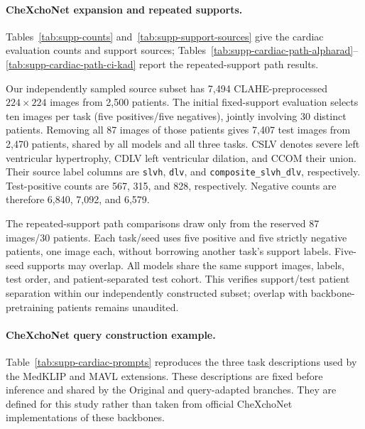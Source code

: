 \paragraph{CheXchoNet expansion and repeated supports.}
Tables~\ref{tab:supp-counts} and~\ref{tab:supp-support-sources} give the cardiac evaluation counts and support sources; Tables~\ref{tab:supp-cardiac-path-alpharad}--\ref{tab:supp-cardiac-path-ci-kad} report the repeated-support path results.

Our independently sampled source subset has 7,494 CLAHE-preprocessed $224\times224$ images from 2,500 patients. The initial fixed-support evaluation selects ten images per task (five positives/five negatives), jointly involving 30 distinct patients. Removing all 87 images of those patients gives 7,407 test images from 2,470 patients, shared by all models and all three tasks. CSLV denotes severe left ventricular hypertrophy, CDLV left ventricular dilation, and CCOM their union. Their source label columns are \texttt{slvh}, \texttt{dlv}, and \texttt{composite\_slvh\_dlv}, respectively. Test-positive counts are 567, 315, and 828, respectively. Negative counts are therefore 6,840, 7,092, and 6,579.


The repeated-support path comparisons draw only from the reserved 87 images/30 patients. Each task/seed uses five positive and five strictly negative patients, one image each, without borrowing another task's support labels. Five-seed supports may overlap. All models share the same support images, labels, test order, and patient-separated test cohort. This verifies support/test patient separation within our independently constructed subset; overlap with backbone-pretraining patients remains unaudited.

\paragraph{CheXchoNet query construction example.}
Table~\ref{tab:supp-cardiac-prompts} reproduces the three task descriptions used by the MedKLIP and MAVL extensions. These descriptions are fixed before inference and shared by the Original and query-adapted branches. They are defined for this study rather than taken from official CheXchoNet implementations of these backbones.


